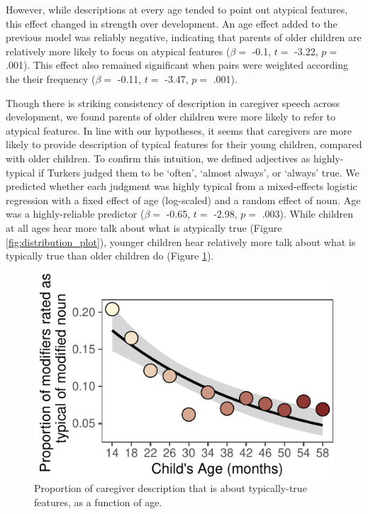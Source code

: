 \documentclass[10pt, letterpaper]{article}
\newenvironment{CodeChunk}{}{}
\begin{document}
However, while descriptions at every age tended to point out atypical
features, this effect changed in strength over development. An age
effect added to the previous model was reliably negative, indicating
that parents of older children are relatively more likely to focus on
atypical features (\(\beta =\) -0.1, \(t =\) -3.22, \(p =\) .001). This
effect also remained significant when pairs were weighted according the
their frequency (\(\beta =\) -0.11, \(t =\) -3.47, \(p =\) .001).

Though there is striking consistency of description in caregiver speech
across development, we found parents of older children were more likely
to refer to atypical features. In line with our hypotheses, it seems
that caregivers are more likely to provide description of typical
features for their young children, compared with older children. To
confirm this intuition, we defined adjectives as highly-typical if
Turkers judged them to be `often', `almost always', or `always' true. We
predicted whether each judgment was highly typical from a mixed-effects
logistic regression with a fixed effect of age (log-scaled) and a random
effect of noun. Age was a highly-reliable predictor (\(\beta =\) -0.65,
\(t =\) -2.98, \(p =\) .003). While children at all ages hear more talk
about what is atypically true (Figure \ref{fig:distribution_plot}),
younger children hear relatively more talk about what is typically true
than older children do (Figure \ref{fig:prototypical_plot}).

\begin{CodeChunk}
\begin{figure}[tb]

{\centering \includegraphics{figs/prototypical_plot-1} 

}

\caption[Proportion of caregiver description that is about typically-true features, as a function of age]{Proportion of caregiver description that is about typically-true features, as a function of age.}\label{fig:prototypical_plot}
\end{figure}
\end{CodeChunk}
\end{document}

